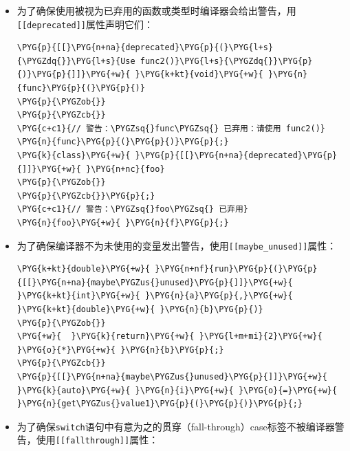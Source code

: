 \begin{itemize}

\item 为了确保使用被视为已弃用的函数或类型时编译器会给出警告，用\texttt{[[deprecated]]}属性声明它们：



\begin{codeblockbg}
\begin{Verbatim}[commandchars=\\\{\},breaklines=true,breakanywhere=true,fontsize=\codefont,xleftmargin=17bp]
\PYG{p}{[[}\PYG{n+na}{deprecated}\PYG{p}{(}\PYG{l+s}{\PYGZdq{}}\PYG{l+s}{Use func2()}\PYG{l+s}{\PYGZdq{}}\PYG{p}{)}\PYG{p}{]]}\PYG{+w}{ }\PYG{k+kt}{void}\PYG{+w}{ }\PYG{n}{func}\PYG{p}{(}\PYG{p}{)}
\PYG{p}{\PYGZob{}}
\PYG{p}{\PYGZcb{}}
\PYG{c+c1}{// 警告：\PYGZsq{}func\PYGZsq{} 已弃用：请使用 func2()}
\PYG{n}{func}\PYG{p}{(}\PYG{p}{)}\PYG{p}{;}
\PYG{k}{class}\PYG{+w}{ }\PYG{p}{[[}\PYG{n+na}{deprecated}\PYG{p}{]]}\PYG{+w}{ }\PYG{n+nc}{foo}
\PYG{p}{\PYGZob{}}
\PYG{p}{\PYGZcb{}}\PYG{p}{;}
\PYG{c+c1}{// 警告：\PYGZsq{}foo\PYGZsq{} 已弃用}
\PYG{n}{foo}\PYG{+w}{ }\PYG{n}{f}\PYG{p}{;}
\end{Verbatim}
\end{codeblockbg}



\item 为了确保编译器不为未使用的变量发出警告，使用\texttt{[[maybe\_\allowbreak{}unused]]}属性：



\begin{codeblockbg}
\begin{Verbatim}[commandchars=\\\{\},breaklines=true,breakanywhere=true,fontsize=\codefont,xleftmargin=17bp]
\PYG{k+kt}{double}\PYG{+w}{ }\PYG{n+nf}{run}\PYG{p}{(}\PYG{p}{[[}\PYG{n+na}{maybe\PYGZus{}unused}\PYG{p}{]]}\PYG{+w}{ }\PYG{k+kt}{int}\PYG{+w}{ }\PYG{n}{a}\PYG{p}{,}\PYG{+w}{ }\PYG{k+kt}{double}\PYG{+w}{ }\PYG{n}{b}\PYG{p}{)}
\PYG{p}{\PYGZob{}}
\PYG{+w}{  }\PYG{k}{return}\PYG{+w}{ }\PYG{l+m+mi}{2}\PYG{+w}{ }\PYG{o}{*}\PYG{+w}{ }\PYG{n}{b}\PYG{p}{;}
\PYG{p}{\PYGZcb{}}
\PYG{p}{[[}\PYG{n+na}{maybe\PYGZus{}unused}\PYG{p}{]]}\PYG{+w}{ }\PYG{k}{auto}\PYG{+w}{ }\PYG{n}{i}\PYG{+w}{ }\PYG{o}{=}\PYG{+w}{ }\PYG{n}{get\PYGZus{}value1}\PYG{p}{(}\PYG{p}{)}\PYG{p}{;}
\end{Verbatim}
\end{codeblockbg}



\item 为了确保\texttt{switch}语句中有意为之的贯穿（fall-through）case标签不被编译器警告，使用\texttt{[[fallthrough]]}属性：



\end{itemize}
